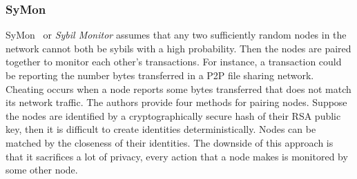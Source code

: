 \subsubsection{SyMon}
SyMon~\cite{jyothi2009symon} or \emph{Sybil Monitor} assumes that any two
sufficiently random nodes in the network cannot both be sybils with a high
probability. Then the nodes are paired together to monitor each other's
transactions. For instance, a transaction could be reporting the number bytes
transferred in a P2P file sharing network. Cheating occurs when a node reports
some bytes transferred that does not match its network traffic. The authors
provide four methods for pairing nodes. Suppose the nodes are identified by a
cryptographically secure hash of their RSA public key, then it is difficult to
create identities deterministically. Nodes can be matched by the closeness of
their identities. The downside of this approach is that it sacrifices a lot of
privacy, every action that a node makes is monitored by some other node.


